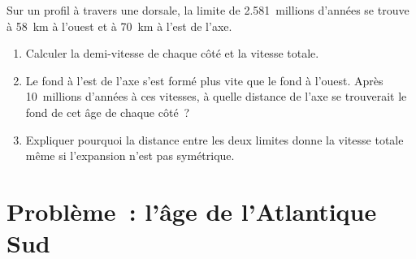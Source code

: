 \begin{exercise}[$\star\star\star$]\label{exo:g11:drift-to-spreading:15}
Sur un profil à travers une dorsale, la limite de \num{2.581}~millions
d'années se trouve à \qty{58}{km} à l'ouest et à \qty{70}{km} à l'est de
l'axe.
\begin{enumerate}
  \item Calculer la demi-vitesse de chaque côté et la vitesse totale.
  \item Le fond à l'est de l'axe s'est formé plus vite que le fond à
        l'ouest. Après 10~millions d'années à ces vitesses, à quelle
        distance de l'axe se trouverait le fond de cet âge de chaque côté~?
  \item Expliquer pourquoi la distance entre les deux limites donne la
        vitesse totale même si l'expansion n'est pas symétrique.
\end{enumerate}
\end{exercise}

\section{Problème~: l'âge de l'Atlantique Sud}


